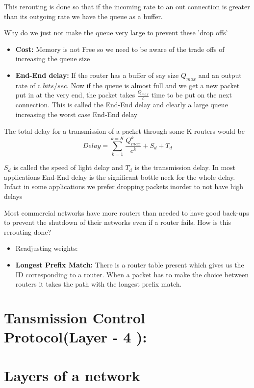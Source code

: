 \documentclass[12pt]{article}
\begin{document}
This rerouting is done so that if the incoming rate to an out connection is greater than its outgoing rate we have the queue as a buffer.


Why do we just not make the queue very large to prevent these 'drop offs'
\begin{itemize}
    \item \textbf{Cost:} Memory is not Free so we need to be aware of the trade offs of increasing the queue size
    \item \textbf{End-End delay:} If the router has a buffer of say size $Q_{max}$ and an output rate of c $bits/sec$.
    Now if the queue is almost full and we get a new packet put in at the very end, the packet takes $\frac{Q_{max}}{c}$ time to be put on the next connection. 
    This is called the End-End delay and clearly a large queue increasing the worst case End-End delay
\end{itemize}

The total delay for a transmission of a packet through some K routers would be 
\[ Delay = \sum_{k = 1}^{k = K}\frac{Q_{max}^k}{c^k} + S_d + T_d\]

\(S_d\) is called the speed of light delay and \(T_d\) is the transmission delay. 
In most applications End-End delay is the significant bottle neck for the whole delay. Infact in some applications 
we prefer dropping packets inorder to not have high delays 

Most commercial networks have more routers than needed to have good back-ups to prevent the shutdown of their networks even if a router 
fails. How is this rerouting done?

\begin{itemize}[itemsep = 0cm, parsep = 0cm, topsep = 0cm]
    \item Readjusting weights:
    \item \textbf{Longest Prefix Match:} There is a router table present which gives us the ID corresponding to a router. When a packet has to make the choice between routers it takes the path with the longest prefix match. 
\end{itemize}


\section{Tansmission Control Protocol(Layer - 4 ):}


\section{Layers of a network}
\end{document}
